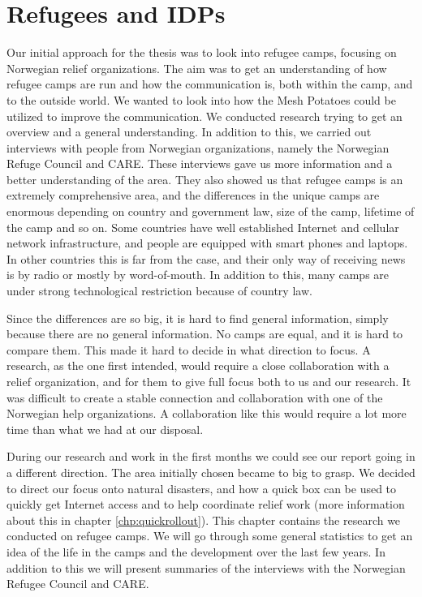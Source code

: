 \chapter{Refugees and IDPs}
\label{chp:refugeecamps} 
Our initial approach for the thesis was to look into refugee camps, focusing on Norwegian relief organizations. The aim was to get an understanding of how refugee camps are run and how the communication is, both within the camp, and to the outside world. We wanted to look into how the Mesh Potatoes could be utilized to improve the communication. We conducted research trying to get an overview and a general understanding. In addition to this, we carried out interviews with people from Norwegian organizations, namely the Norwegian Refuge Council and CARE. These interviews gave us more information and a better understanding of the area. They also showed us that refugee camps is an extremely comprehensive area, and the differences in the unique camps are enormous depending on country and government law, size of the camp, lifetime of the camp and so on. Some countries have well established Internet and cellular network infrastructure, and people are equipped with smart phones and laptops. In other countries this is far from the case, and their only way of receiving news is by radio or mostly by word-of-mouth. In addition to this, many camps are under strong technological restriction because of country law. 

Since the differences are so big, it is hard to find general information, simply because there are no general information. No camps are equal, and it is hard to compare them. This made it hard to decide in what direction to focus. A research, as the one first intended, would require a close collaboration with a relief organization, and for them to give full focus both to us and our research. It was difficult to create a stable connection and collaboration with one of the Norwegian help organizations. A collaboration like this would require a lot more time than what we had at our disposal. 
  
During our research and work in the first months we could see our report going in a different direction. The area initially chosen became to big to grasp. We decided to direct our focus onto natural disasters, and how a \gls{quick} box can be used to quickly get Internet access and to help coordinate relief work (more information about this in chapter \ref{chp:quickrollout}).
This chapter contains the research we conducted on refugee camps. We will go through some general statistics to get an idea of the life in the camps and the development over the last few years. In addition to this we will present summaries of the interviews with the Norwegian Refugee Council and CARE.

